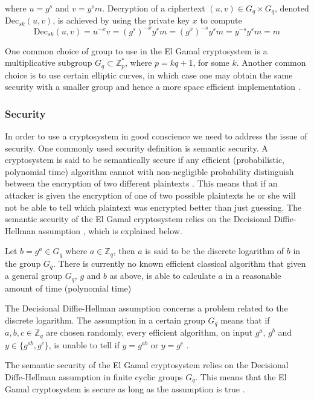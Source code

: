  where $u = g^s$ and $v = y^sm$. Decryption of a ciphertext $(u,v) \in
 G_q \times G_q$, denoted $\mathrm{Dec}_{sk}(u,v)$, is achieved by
 using the private key $x$ to compute
$$
\mathrm{Dec}_{sk}(u,v) = u^{-x}v =
(g^s)^{-x}y^sm = (g^x)^{-s}y^sm = y^{-s}y^sm = m
$$

One common choice of group to use in the El Gamal cryptosystem is a
multiplicative subgroup $G_q \subset \mathbb{Z}_p^*$, where $p = kq +
1$, for some $k$. Another common choice is to use certain elliptic
curves, in which case one may obtain the same security with a smaller
group and hence a more space efficient implementation
\cite[p.~297]{hac}.

\subsubsection{Security}
In order to use a cryptosystem in good conscience we need to address
the issue of security. One commonly used security definition is
semantic security. A cryptosystem is said to be semantically secure if
any efficient (probabilistic, polynomial time) algorithm cannot with
non-negligible probability distinguish between the encryption of two
different plaintexts \cite[p.~306]{hac}. This means that if an
attacker is given the encryption of one of two possible plaintexts he
or she will not be able to tell which plaintext was encrypted better
than just guessing. The semantic security of the El Gamal cryptosystem
relies on the Decisional Diffie-Hellman assumption \cite{wikstrom2},
which is explained below.

Let $b = g^a \in G_q$ where $a \in \mathbb{Z}_q$, then $a$ is said to
be the discrete logarithm of $b$ in the group $G_q$. There is
currently no known efficient classical algorithm that given a general
group $G_q$, $g$ and $b$ as above, is able to calculate $a$ in a
reasonable amount of time (polynomial time) \cite[p.~103]{hac}

The Decisional Diffie-Hellman assumption concerns a problem related to
the discrete logarithm. The assumption in a certain group $G_q$ means
that if $a,b,c \in \mathbb{Z}_q$ are chosen randomly, every efficient
algorithm, on input $g^a$, $g^b$ and $y \in \{g^{ab}, g^c\}$, is
unable to tell if $y = g^{ab}$ or $y = g^c$ \cite{wikstrom2}.

The semantic security of the El Gamal cryptosystem relies on the
Decisional Diffe-Hellman assumption in finite cyclic groups
$G_q$. This means that the El Gamal cryptosystem is secure as long as
the assumption is true \cite{wikstrom2}. 

